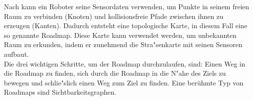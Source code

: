 %
Nach \cite{Principles:05} kann ein Roboter seine Sensordaten verwenden, um Punkte in seinem freien Raum zu verbinden (Knoten) und kollisionsfreie Pfade zwischen ihnen zu erzeugen (Kanten). Dadurch entsteht eine topologische Karte, in diesem Fall eine so genannte Roadmap. Diese Karte kann verwendet werden, um unbekannten Raum zu erkunden, indem er zunehmend die Stra{"s}enkarte mit seinen Sensoren aufbaut.\\
Die drei wichtigen Schritte, um der Roadmap durchzulaufen, sind: Einen Weg in die Roadmap zu finden, sich durch die Roadmap in die N"ahe des Ziels zu bewegen und schlie{"s}lich einen Weg zum Ziel zu finden.
Eine berühmte Typ von Roadmaps sind Sichtbarkeitsgraphen.


